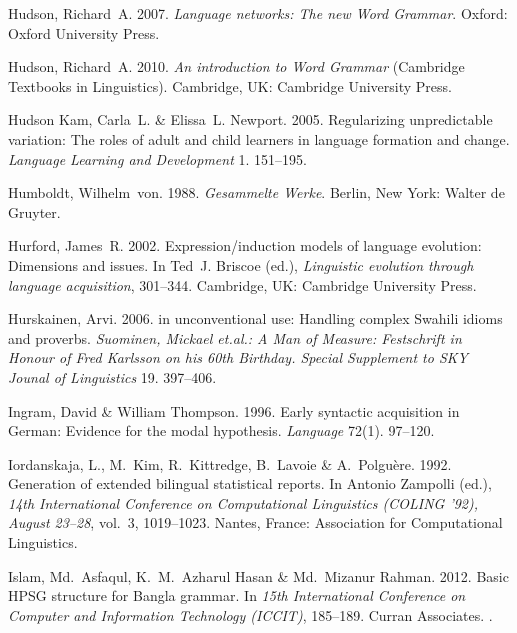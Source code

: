 \begin{thebibliography}{1420}
Hudson, Richard~A. 2007.
\newblock \emph{Language networks: {The} new {Word Grammar}}.
\newblock Oxford: Oxford University Press.

Hudson, Richard~A. 2010{}.
\newblock \emph{An introduction to {Word Grammar}}  (Cambridge Textbooks in
  Linguistics).
\newblock Cambridge, UK: Cambridge University Press.

{Hudson Kam}, Carla~L. \& Elissa~L. Newport. 2005.
\newblock Regularizing unpredictable variation: {The} roles of adult and child
  learners in language formation and change.
\newblock \emph{Language Learning and Development} 1. 151--195.

Humboldt, Wilhelm~von. 1988.
\newblock \emph{{Gesammelte Werke}}.
\newblock Berlin, New York: Walter de Gruyter.

Hurford, James~R. 2002.
\newblock Expression/induction models of language evolution: Dimensions and
  issues.
\newblock In Ted~J. Briscoe (ed.), \emph{Linguistic evolution through language
  acquisition}, 301--344. Cambridge, UK: Cambridge University Press.

Hurskainen, Arvi. 2006.
 in unconventional use: {Handling} complex
  {Swahili} idioms and proverbs.
\newblock \emph{Suominen, Mickael et.al.: {A} Man of Measure: {Festschrift} in
  Honour of {Fred Karlsson} on his 60th Birthday. Special Supplement to SKY
  Jounal of Linguistics} 19. 397--406.

Ingram, David \& William Thompson. 1996.
\newblock Early syntactic acquisition in {German}: {Evidence} for the modal
  hypothesis.
\newblock \emph{Language} 72(1). 97--120.

Iordanskaja, L., M.~Kim, R.~Kittredge, B.~Lavoie \& A.~Polgu\`{e}re. 1992.
\newblock Generation of extended bilingual statistical reports.
\newblock In Antonio Zampolli (ed.), \emph{{14th International Conference on
  Computational Linguistics (COLING '92), August 23--28}}, vol.~3, 1019--1023.
  Nantes, France: Association for Computational Linguistics.

Islam, Md.~Asfaqul, K.~M.~Azharul Hasan \& Md.~Mizanur Rahman. 2012.
\newblock Basic {HPSG} structure for {Bangla} grammar.
\newblock In \emph{15th {International Conference on Computer and Information
  Technology (ICCIT)}}, 185--189. Curran Associates.
\newblock {}.


\end{thebibliography}
